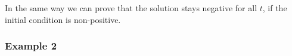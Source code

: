             \normalsize
            In the same way we can prove that the solution stays negative for all $t$, if the initial condition is non-positive.

        \subsubsection{Example 2}
            \label{sec:ddi-example-2}

